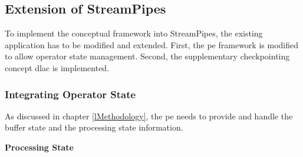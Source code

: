 \subsection{Extension of StreamPipes}
\label{lModifications}

To implement the conceptual framework into StreamPipes, the existing application has to be modified and extended. First, the \gls{pe} framework is modified to allow operator state management. Second, the supplementary checkpointing concept \gls{dlac} is implemented.

\subsubsection{Integrating Operator State}
\label{lIntegratingOperatorState}

As discussed in chapter \ref{lMethodology}, the \gls{pe} needs to provide and handle the buffer state and the processing state information.\par

\textbf{Processing State}\par

